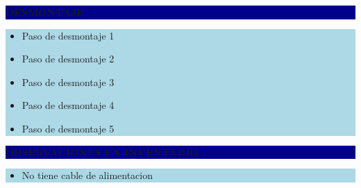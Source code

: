 \documentclass[11pt]{article}
\newcommand{\seccionbanda}[1]{%
  \vspace{0.6em}
  \noindent\colorbox{darkblue}{\parbox{\dimexpr\linewidth-2\fboxsep}{%
    \centering\color{white}\bfseries #1}}\par\vspace{0.6em}
}
\begin{document}
\seccionbanda{DESMONTAJE}
\noindent\colorbox{lightblue}{\parbox{\dimexpr\linewidth-2\fboxsep\relax}{%
\begin{itemize}[label=$\square$, itemsep=4pt]
\item Paso de desmontaje 1
\item Paso de desmontaje 2
\item Paso de desmontaje 3
\item Paso de desmontaje 4
\item Paso de desmontaje 5
\end{itemize}
}}\par
\seccionbanda{OBSERVACIONES EN INVENTARIO}
\noindent\colorbox{lightblue}{\parbox{\dimexpr\linewidth-2\fboxsep\relax}{\begin{itemize}[itemsep=4pt]
\item No tiene cable de alimentacion
\end{itemize}}}\par
\end{document}
